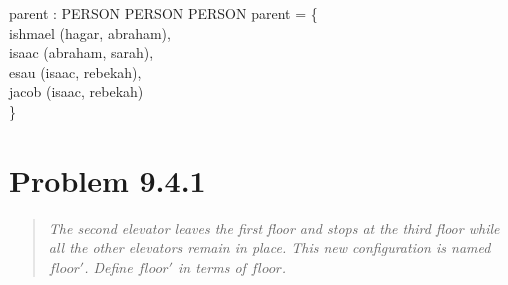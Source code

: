 \documentclass[10pt]{article}
\begin{document}
\begin{axdef}
  parent : PERSON \rel PERSON \cross PERSON
  \where
  parent = \{ \\
  ishmael \mapsto (hagar, abraham), \\
  isaac \mapsto (abraham, sarah), \\
  esau \mapsto (isaac, rebekah), \\
  jacob \mapsto (isaac, rebekah) \\
  \}
\end{axdef}

\section{Problem 9.4.1}
\begin{quote}
  {\it The second elevator leaves the first floor and stops at the third floor while all the other
    elevators remain in place.  This new configuration is named $floor'$.  Define $floor'$ in terms
    of $floor$.}

\end{quote}
\end{document}
